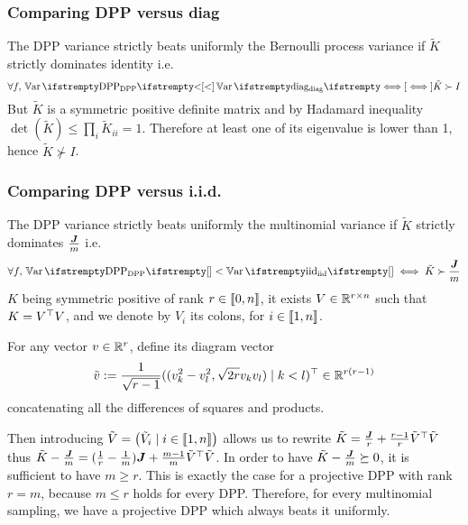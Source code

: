 \subsubsection{Comparing DPP versus diag}
The DPP variance strictly beats uniformly the Bernoulli process variance if $\tilde K$ strictly dominates identity i.e. 
\begin{equation}
	\forall \query, \, \Var{\textrm{DPP}} < \Var{\textrm{diag}} \iff \tilde K \succ I
\end{equation}
But $\tilde K$ is a symmetric positive definite matrix and by Hadamard inequality $\det( \tilde K) \leq \prod_{i} \tilde K_{ii}= 1$. Therefore at least one of its eigenvalue is lower than 1, hence $\tilde K \nsucc I$.

\subsubsection{Comparing DPP versus i.i.d.}
The DPP variance strictly beats uniformly the multinomial variance if $\tilde K$ strictly dominates $\frac{\boldsymbol{J}}{m}$ i.e. 
\begin{equation}
	\forall \query, \, \Var{\textrm{DPP}}{} < \Var{\textrm{iid}}{} \iff \tilde K \succ \frac{\moones}{m}
\end{equation}
$K$ being symmetric positive of rank $r \in \llbracket 0,n \rrbracket$, it exists $V \in \mathbb{R}^{r \times n}$ such that $K = V^\top V$, and we denote by $V_i$ its colons, for $i \in \llbracket 1,n \rrbracket$.

For any vector $v \in \mathbb{R}^{r}$, \cite{copenhaver2013diagramvectors} define its diagram vector 
$$\tilde v :=
 \frac{1}{\sqrt{r-1}} ((v_k^{2}-v_l^{2} , \sqrt{2 r} v_k v_l ) \mid k<l)^\top \in \mathbb{R}^{r(r-1)}$$
concatenating all the differences of squares and products.

Then introducing $\tilde V = \begin{pmatrix}\tilde V_i \mid i\in\llbracket 1,n \rrbracket\end{pmatrix}
$ allows us to rewrite $\tilde K = \frac{\boldsymbol{J}}{r} + \frac{r-1}{r} \tilde V^\top \tilde V$ thus $\tilde K - \frac{\boldsymbol{J}}{m} = (\frac{1}{r}-\frac{1}{m})\boldsymbol{J} + \frac{m-1}{m} \tilde V^\top \tilde V$. In order to have $\tilde K - \frac{\boldsymbol{J}}{m}\succeq 0$, it is sufficient to have $m \geq r$. This is exactly the case for a projective DPP with rank $r = m$, because $m \leq r$ holds for every DPP. Therefore, for every multinomial sampling, we have a projective DPP which always beats it uniformly.




